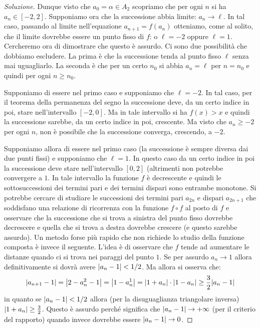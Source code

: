 \begin{proof}[Soluzione]
  Dunque visto che $a_0 = \alpha \in A_2$ scopriamo che per ogni $n$
  si ha $a_n \in [-2,2]$. Supponiamo ora che la successione abbia
  limite: $a_n \to \ell$. In tal caso, passando al limite
  nell'equazione $a_{n+1} = f(a_n)$ otteniamo, come al solito, che il
  limite dovrebbe essere un punto fisso di $f$: o $\ell=-2$ oppure
  $\ell=1$. Cercheremo ora di dimostrare che questo è assurdo. Ci sono
  due possibilità che dobbiamo escludere. La prima è che la
  successione tenda al punto fisso $\ell$ senza mai uguagliarlo. La
  seconda è che per un certo $n_0$ si abbia $a_n = \ell$ per $n=n_0$ e
  quindi per ogni $n\ge n_0$.

  Supponiamo di essere nel primo caso e supponiamo che $\ell = -2$. In
  tal caso, per il teorema della permanenza del segno la successione
  deve, da un certo indice in poi, stare nell'intervallo $[-2, 0]$. Ma
  in tale intervallo si ha $f(x)>x$ e quindi la successione sarebbe,
  da un certo indice in poi, crescente. Ma visto che $a_n \ge -2$ per
  ogni $n$, non è possibile che la successione converga, crescendo, a
  $-2$.

  Supponiamo allora di essere nel primo caso (la successione è sempre
  diversa dai due punti fissi) e supponiamo che $\ell = 1$. In
  questo caso da un certo indice in poi la successione deve stare
  nell'intervallo $[0,2]$ (altrimenti non potrebbe convergere a
  $1$. In tale intervallo la funzione $f$ è decrescente e quindi
  le sottosuccessioni dei termini pari e dei termini dispari sono
  entrambe monotone. Si potrebbe cercare di studiare le successioni dei
  termini pari $a_{2n}$ e dispari $a_{2n+1}$ che soddisfano una relazione di ricorrenza
  con la funzione $f\circ f$ al posto di $f$ e osservare che la successione
  che si trova a sinistra del punto fisso dovrebbe decrescere e quella che si trova a
  destra dovrebbe crescere (e questo sarebbe assurdo). Un metodo forse più
  rapido che non richiede lo studio della funzione composta è invece il seguente.
  L'idea è di osservare che $f$ tende ad aumentare le distanze quando ci si trova
  nei paraggi del punto $1$. Se per assurdo $a_n\to 1$ allora definitivamente
  si dovrà avere ${\left|a_n-1\right|}< 1/2$. Ma allora si osserva che:
  \[
    {\left|a_{n+1}-1\right|}
    = {\left|2-a_n^2-1\right|}={\left|1-a_n^1\right|}
    = {\left|1+a_n\right|}\cdot {\left|1-a_n\right|}
    \ge \frac 3 2 {\left|a_n-1\right|}
  \]
  in quanto se ${\left|a_n-1\right|}<1/2$ allora (per la disuguaglianza triangolare inversa)
  ${\left|1+a_n\right|}\ge \frac 3 2$. Questo è assurdo perché significa che ${\left|a_n -1\right|}\to +\infty$
  (per il criterio del rapporto) quando invece dovrebbe essere ${\left|a_n-1\right|}\to 0$.


\end{proof}
